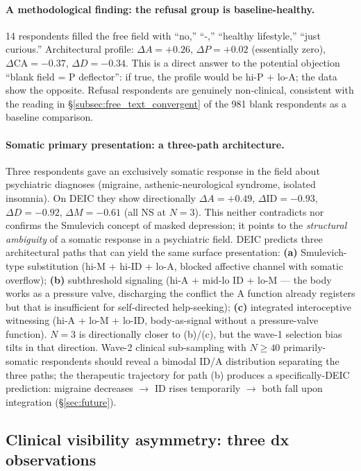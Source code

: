 \paragraph{A methodological finding: the refusal group is baseline-healthy.} 14 respondents filled the free field with ``no,'' ``-,'' ``healthy lifestyle,'' ``just curious.'' Architectural profile: $\Delta A = +0.26$, $\Delta P = +0.02$ (essentially zero), $\Delta \text{CA} = -0.37$, $\Delta D = -0.34$. This is a direct answer to the potential objection ``blank field = P deflector'': if true, the profile would be hi-P + lo-A; the data show the opposite. Refusal respondents are genuinely non-clinical, consistent with the reading in §\ref{subsec:free_text_convergent} of the 981 blank respondents as a baseline comparison.

\paragraph{Somatic primary presentation: a three-path architecture.} Three respondents gave an exclusively somatic response in the field about psychiatric diagnoses (migraine, asthenic-neurological syndrome, isolated insomnia). On DEIC they show directionally $\Delta A = +0.49$, $\Delta \text{ID} = -0.93$, $\Delta D = -0.92$, $\Delta M = -0.61$ (all NS at $N = 3$). This neither contradicts nor confirms the Smulevich concept of masked depression; it points to the \emph{structural ambiguity} of a somatic response in a psychiatric field. DEIC predicts three architectural paths that can yield the same surface presentation: \textbf{(a)} Smulevich-type substitution (hi-M + hi-ID + lo-A, blocked affective channel with somatic overflow); \textbf{(b)} subthreshold signaling (hi-A + mid-lo ID + lo-M --- the body works as a pressure valve, discharging the conflict the A function already registers but that is insufficient for self-directed help-seeking); \textbf{(c)} integrated interoceptive witnessing (hi-A + lo-M + lo-ID, body-as-signal without a pressure-valve function). $N = 3$ is directionally closer to (b)/(c), but the wave-1 selection bias tilts in that direction. Wave-2 clinical sub-sampling with $N \geq 40$ primarily-somatic respondents should reveal a bimodal ID/A distribution separating the three paths; the therapeutic trajectory for path (b) produces a specifically-DEIC prediction: migraine decreases $\to$ ID rises temporarily $\to$ both fall upon integration (§\ref{sec:future}).

\subsection{Clinical visibility asymmetry: three dx observations}
\label{subsec:dx_asymmetry_trio}

